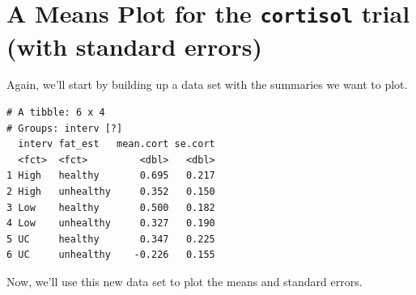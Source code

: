 \documentclass[]{book}
\newenvironment{Shaded}{\begin{snugshade}}{\end{snugshade}}
\newcommand{\KeywordTok}[1]{\textcolor[rgb]{0.13,0.29,0.53}{\textbf{#1}}}
\newcommand{\DataTypeTok}[1]{\textcolor[rgb]{0.13,0.29,0.53}{#1}}
\newcommand{\StringTok}[1]{\textcolor[rgb]{0.31,0.60,0.02}{#1}}
\newcommand{\OperatorTok}[1]{\textcolor[rgb]{0.81,0.36,0.00}{\textbf{#1}}}
\newcommand{\NormalTok}[1]{#1}
\theoremstyle{definition}
\theoremstyle{definition}
\theoremstyle{definition}
\theoremstyle{remark}
\begin{document}
\section{\texorpdfstring{A Means Plot for the \texttt{cortisol} trial
(with standard
errors)}{A Means Plot for the cortisol trial (with standard errors)}}\label{a-means-plot-for-the-cortisol-trial-with-standard-errors}

Again, we'll start by building up a data set with the summaries we want
to plot.

\begin{Shaded}
\end{Shaded}

\begin{verbatim}
# A tibble: 6 x 4
# Groups: interv [?]
  interv fat_est   mean.cort se.cort
  <fct>  <fct>         <dbl>   <dbl>
1 High   healthy       0.695   0.217
2 High   unhealthy     0.352   0.150
3 Low    healthy       0.500   0.182
4 Low    unhealthy     0.327   0.190
5 UC     healthy       0.347   0.225
6 UC     unhealthy    -0.226   0.155
\end{verbatim}

Now, we'll use this new data set to plot the means and standard errors.
\end{document}
